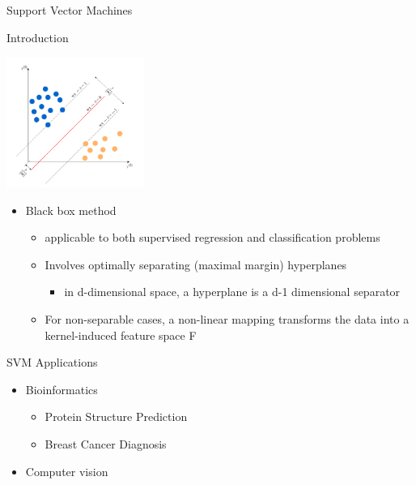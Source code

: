 \documentclass[ignorenonframetext,]{beamer}
\providecommand{\tightlist}{%
  \setlength{\itemsep}{0pt}\setlength{\parskip}{0pt}}
\begin{document}
\begin{frame}[fragile]{Support Vector Machines}

\begin{block}{Introduction}

\begin{center}\includegraphics[width=170px]{svm1} \end{center}

\begin{itemize}
\tightlist
\item
  Black box method

  \begin{itemize}
  \tightlist
  \item
    applicable to both supervised regression and classification problems
  \item
    Involves optimally separating (maximal margin) hyperplanes

    \begin{itemize}
    \tightlist
    \item
      in d-dimensional space, a hyperplane is a d-1 dimensional
      separator
    \end{itemize}
  \item
    For non-separable cases, a non-linear mapping transforms the data
    into a kernel-induced feature space F
  \end{itemize}
\end{itemize}

\end{block}

\begin{block}{SVM Applications}

\begin{itemize}
\tightlist
\item
  Bioinformatics

  \begin{itemize}
  \tightlist
  \item
    Protein Structure Prediction
  \item
    Breast Cancer Diagnosis
  \end{itemize}
\item
  Computer vision


\end{itemize}
\end{block}
\end{frame}
\end{document}
